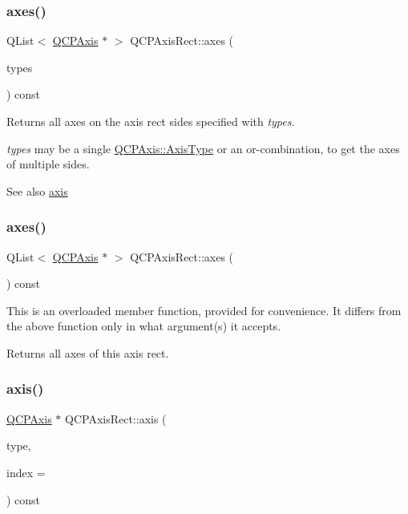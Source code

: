 \subsubsection{\texorpdfstring{axes()}{axes()}\hspace{0.1cm}{\footnotesize\ttfamily [1/2]}}
{\footnotesize\ttfamily Q\+List$<$ \hyperlink{class_q_c_p_axis}{Q\+C\+P\+Axis} $\ast$ $>$ Q\+C\+P\+Axis\+Rect\+::axes (\begin{DoxyParamCaption}\item[{Q\+C\+P\+Axis\+::\+Axis\+Types}]{types }\end{DoxyParamCaption}) const}

Returns all axes on the axis rect sides specified with {\itshape types}.

{\itshape types} may be a single \hyperlink{class_q_c_p_axis_ae2bcc1728b382f10f064612b368bc18a}{Q\+C\+P\+Axis\+::\+Axis\+Type} or an {\ttfamily or}-\/combination, to get the axes of multiple sides.

\begin{DoxySeeAlso}{See also}
\hyperlink{class_q_c_p_axis_rect_a583ae4f6d78b601b732183f6cabecbe1}{axis} 
\end{DoxySeeAlso}
\hypertarget{class_q_c_p_axis_rect_a11657b8faebe9677180860e8057ede26}{}\label{class_q_c_p_axis_rect_a11657b8faebe9677180860e8057ede26} 
\subsubsection{\texorpdfstring{axes()}{axes()}\hspace{0.1cm}{\footnotesize\ttfamily [2/2]}}
{\footnotesize\ttfamily Q\+List$<$ \hyperlink{class_q_c_p_axis}{Q\+C\+P\+Axis} $\ast$ $>$ Q\+C\+P\+Axis\+Rect\+::axes (\begin{DoxyParamCaption}{ }\end{DoxyParamCaption}) const}

This is an overloaded member function, provided for convenience. It differs from the above function only in what argument(s) it accepts.

Returns all axes of this axis rect. \hypertarget{class_q_c_p_axis_rect_a583ae4f6d78b601b732183f6cabecbe1}{}\label{class_q_c_p_axis_rect_a583ae4f6d78b601b732183f6cabecbe1} 
\subsubsection{\texorpdfstring{axis()}{axis()}}
{\footnotesize\ttfamily \hyperlink{class_q_c_p_axis}{Q\+C\+P\+Axis} $\ast$ Q\+C\+P\+Axis\+Rect\+::axis (\begin{DoxyParamCaption}\item[{\hyperlink{class_q_c_p_axis_ae2bcc1728b382f10f064612b368bc18a}{Q\+C\+P\+Axis\+::\+Axis\+Type}}]{type,  }\item[{int}]{index = {} }\end{DoxyParamCaption}) const}

